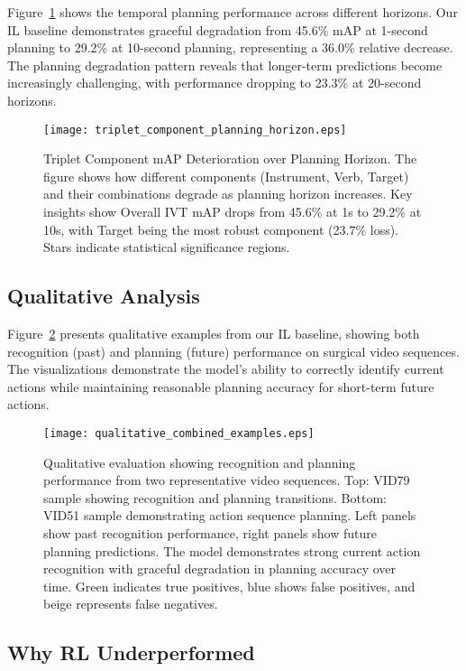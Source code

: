 \documentclass[runningheads]{llncs}
\begin{document}
Figure~\ref{fig:planning_analysis} shows the temporal planning performance across different horizons. Our IL baseline demonstrates graceful degradation from 45.6\% mAP at 1-second planning to 29.2\% at 10-second planning, representing a 36.0\% relative decrease. The planning degradation pattern reveals that longer-term predictions become increasingly challenging, with performance dropping to 23.3\% at 20-second horizons.

\begin{figure}[h]
\centering
\texttt{[image: triplet\_component\_planning\_horizon.eps]}
\caption{Triplet Component mAP Deterioration over Planning Horizon. The figure shows how different components (Instrument, Verb, Target) and their combinations degrade as planning horizon increases. Key insights show Overall IVT mAP drops from 45.6\% at 1s to 29.2\% at 10s, with Target being the most robust component (23.7\% loss). Stars indicate statistical significance regions.}
\label{fig:planning_analysis}
\end{figure}

\subsection{Qualitative Analysis}

Figure~\ref{fig:qualitative_examples} presents qualitative examples from our IL baseline, showing both recognition (past) and planning (future) performance on surgical video sequences. The visualizations demonstrate the model's ability to correctly identify current actions while maintaining reasonable planning accuracy for short-term future actions.

\begin{figure}[h]
\centering
\texttt{[image: qualitative\_combined\_examples.eps]}
\caption{Qualitative evaluation showing recognition and planning performance from two representative video sequences. Top: VID79 sample showing recognition and planning transitions. Bottom: VID51 sample demonstrating action sequence planning. Left panels show past recognition performance, right panels show future planning predictions. The model demonstrates strong current action recognition with graceful degradation in planning accuracy over time. Green indicates true positives, blue shows false positives, and beige represents false negatives.}
\label{fig:qualitative_examples}
\end{figure}

\subsection{Why RL Underperformed}
\end{document}

